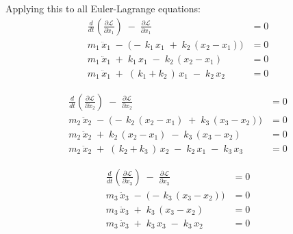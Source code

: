 Applying this to all Euler-Lagrange equations:
\begin{align}
\frac{d}{dt}\left(\frac{\partial \mathcal{L}}{\partial \dot{x}_{1}}\right)
\;-\;\frac{\partial \mathcal{L}}{\partial x_{1}}
&= 0 \\[6pt]
m_{1}\,\ddot{x}_{1}
\;-\;\bigl(-\,k_{1}\,x_{1} \;+\; k_{2}\,(x_{2} - x_{1})\bigr)
&= 0 \\[6pt]
m_{1}\,\ddot{x}_{1} \;+\; k_{1}\,x_{1} \;-\; k_{2}\,(x_{2} - x_{1})
&= 0 \\[6pt]
m_{1}\,\ddot{x}_{1} \;+\; (\,k_{1} + k_{2}\,)\,x_{1} \;-\; k_{2}\,x_{2}
&= 0
\end{align}

\begin{align}
\frac{d}{dt}\left(\frac{\partial \mathcal{L}}{\partial \dot{x}_{2}}\right)
\;-\;\frac{\partial \mathcal{L}}{\partial x_{2}}
&= 0 \\[6pt]
m_{2}\,\ddot{x}_{2}
\;-\;\bigl(-\,k_{2}\,(x_{2} - x_{1}) \;+\; k_{3}\,(x_{3} - x_{2})\bigr)
&= 0 \\[6pt]
m_{2}\,\ddot{x}_{2} \;+\; k_{2}\,(x_{2} - x_{1}) \;-\; k_{3}\,(x_{3} - x_{2})
&= 0 \\[6pt]
m_{2}\,\ddot{x}_{2} \;+\; (\,k_{2} + k_{3}\,)\,x_{2} \;-\; k_{2}\,x_{1} \;-\; k_{3}\,x_{3}
&= 0
\end{align}

\begin{align}
\frac{d}{dt}\left(\frac{\partial \mathcal{L}}{\partial \dot{x}_{3}}\right)
\;-\;\frac{\partial \mathcal{L}}{\partial x_{3}}
&= 0 \\[6pt]
m_{3}\,\ddot{x}_{3}
\;-\;\bigl(-\,k_{3}\,(x_{3} - x_{2})\bigr)
&= 0 \\[6pt]
m_{3}\,\ddot{x}_{3} \;+\; k_{3}\,(x_{3} - x_{2})
&= 0 \\[6pt]
m_{3}\,\ddot{x}_{3} \;+\; k_{3}\,x_{3} \;-\; k_{3}\,x_{2}
&= 0
\end{align}
